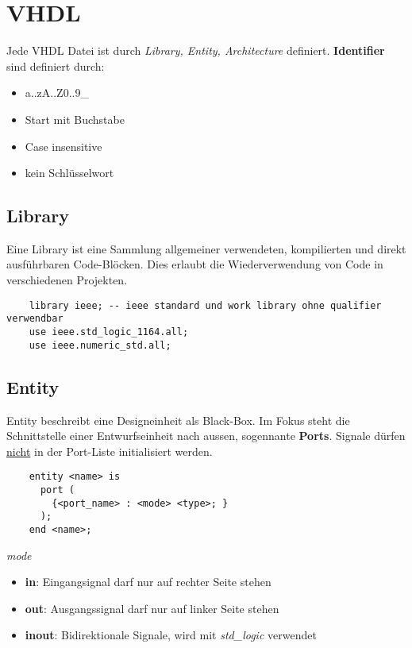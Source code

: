 \section{VHDL}
Jede VHDL Datei ist durch \textit{Library, Entity, Architecture} definiert. \textbf{Identifier} sind definiert durch:
\begin{itemize}[nosep]
	\item a..zA..Z0..9\_
	\item Start mit Buchstabe
	\item Case insensitive
	\item kein Schlüsselwort
\end{itemize}

\subsection{Library}
Eine Library ist eine Sammlung allgemeiner verwendeten, kompilierten und direkt ausführbaren Code-Blöcken. Dies erlaubt die Wiederverwendung von Code in verschiedenen Projekten.

\begin{lstlisting}
	library ieee; -- ieee standard und work library ohne qualifier verwendbar
	use ieee.std_logic_1164.all;
	use ieee.numeric_std.all;
\end{lstlisting}


\subsection{Entity}
Entity beschreibt eine Designeinheit als Black-Box. Im Fokus steht die Schnittstelle einer Entwurfseinheit nach aussen, sogennante \textbf{Ports}. Signale dürfen \underline{nicht} in der Port-Liste initialisiert werden.

\begin{lstlisting}
	entity <name> is 
	  port (
	    {<port_name> : <mode> <type>; }
	  );
	end <name>;
\end{lstlisting}
\noindent\textit{mode}
\begin{itemize}[nosep]
	\item \textbf{in}: Eingangsignal darf nur auf rechter Seite stehen
	\item \textbf{out}: Ausgangssignal darf nur auf linker Seite stehen
	\item \textbf{inout}: Bidirektionale Signale, wird mit \textit{std\_logic} verwendet
\end{itemize}

